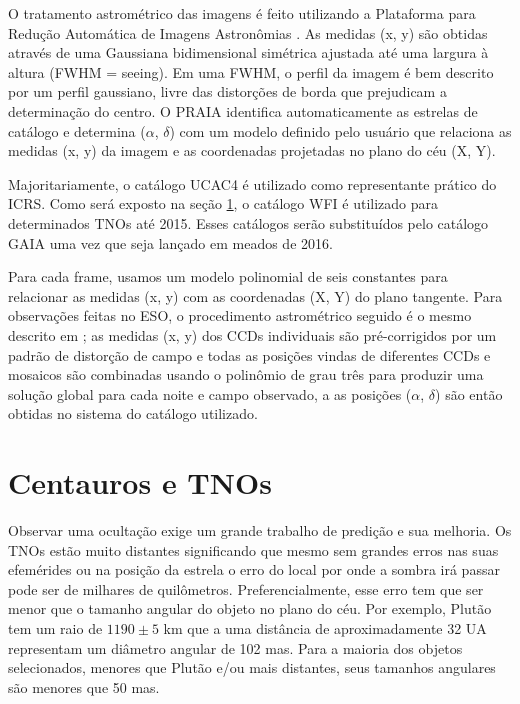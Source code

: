 \documentclass[12pt,a4paper]{monografia}
\begin{document}
O tratamento astrométrico das imagens é feito utilizando a Plataforma para Redução Automática de Imagens Astronômias \citep[PRAIA][]{Assafin2011}. As medidas (x, y) são obtidas através de uma Gaussiana bidimensional simétrica ajustada até uma largura à altura (FWHM = seeing). Em uma FWHM, o perfil da imagem é bem descrito por um perfil gaussiano, livre das distorções de borda que prejudicam a determinação do centro. O PRAIA identifica automaticamente as estrelas de catálogo e determina ($\alpha$, $\delta$) com um modelo definido pelo usuário que relaciona as medidas (x, y) da imagem e as coordenadas projetadas no plano do céu (X, Y).

Majoritariamente, o catálogo UCAC4 \citep{Zacharias2013} é utilizado como representante prático do ICRS. Como será exposto na seção \ref{Sec: TNOs-astrometria}, o catálogo WFI é utilizado para determinados TNOs até 2015. Esses catálogos serão substituídos pelo catálogo GAIA uma vez que seja lançado em meados de 2016.

Para cada frame, usamos um modelo polinomial de seis constantes para relacionar as medidas (x, y) com as coordenadas (X, Y) do plano tangente. Para observações feitas no ESO, o procedimento astrométrico seguido é o mesmo descrito em \citep{Assafin2012}; as medidas (x, y) dos CCDs individuais são pré-corrigidos por um padrão de distorção de campo e todas as posições vindas de diferentes CCDs e mosaicos são combinadas usando o polinômio de grau três para produzir uma solução global para cada noite e campo observado, a as posições ($\alpha$, $\delta$) são então obtidas no sistema do catálogo utilizado.


\section{Centauros e TNOs}
\label{Sec: TNOs-astrometria}

\indent \indent Observar uma ocultação exige um grande trabalho de predição e sua melhoria. Os TNOs estão muito distantes significando que mesmo sem grandes erros nas suas efemérides ou na posição da estrela o erro do local por onde a sombra irá passar pode ser de milhares de quilômetros. Preferencialmente, esse erro tem que ser menor que o tamanho angular do objeto no plano do céu. Por exemplo, Plutão tem um raio de $1190 \pm 5$ km \cite[submetido]{DiasOliveira2015} que a uma distância de aproximadamente 32 UA representam um diâmetro angular de 102 mas. Para a maioria dos objetos selecionados, menores que Plutão e/ou mais distantes, seus tamanhos angulares são menores que 50 mas.
\end{document}

